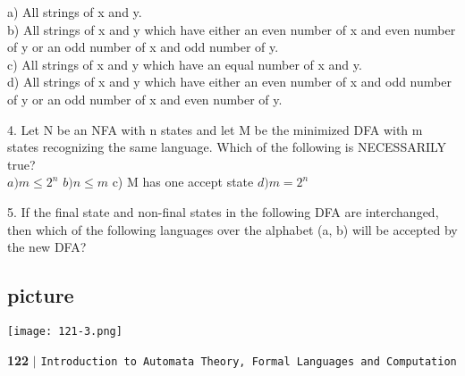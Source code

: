 \documentclass{article}
\begin{document}
a) All strings of x and y.\\
b) All strings of x and y which have either an even number of x and even number of y or an odd
number of x and odd number of y.\\
c) All strings of x and y which have an equal number of x and y.\\
d) All strings of x and y which have either an even number of x and odd number of y or an odd
number of x and even number of y.\\
\vspace*{3mm}

\vspace*{0.2cm}

4. Let N be an NFA with n states and let M be the minimized DFA with m states recognizing the
same language. Which of the following is NECESSARILY true?\\

\vspace*{3mm}
\hspace{0.5cm}
$a) m \leq 2 ^{n}$  \hspace*{0.5cm}  $b) n \leq m$  \hspace*{0.5cm}   c) M has one accept state  \hspace*{0.5cm}  $d) m = 2 ^{n}$ \\
\vspace*{3mm}

\vspace*{0.2cm}
5. If the final state and non-final states in the following DFA are interchanged, then which of the
following languages over the alphabet (a, b) will be accepted by the new DFA?\\

\begin{center}
\section{picture}
\texttt{[image: 121-3.png]}
\end{center}


\newpage
 \begin{flushleft}
    \textbf{122}\hspace*{0.1cm} \textbf{$|$} \hspace*{0.1cm} \texttt{Introduction to Automata Theory, Formal Languages and Computation}
  \end{flushleft}
\vspace*{0.4cm}

\vspace*{3mm}
\end{document}
